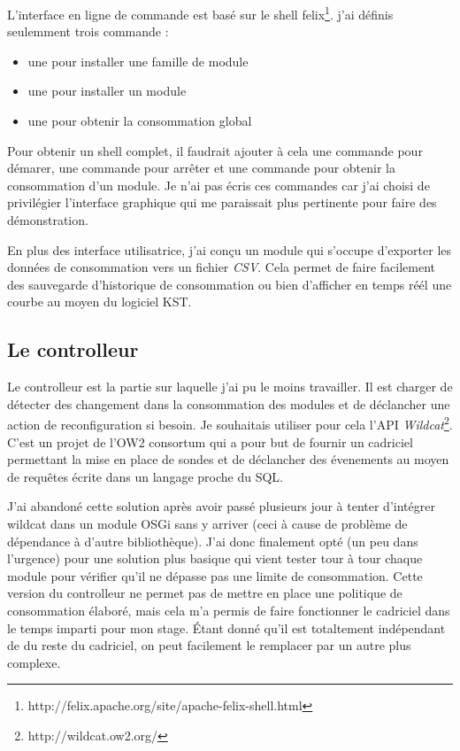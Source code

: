 \documentclass[a4paper, 11pt]{report}
\begin{document}
L'interface en ligne de commande est basé sur le shell felix\footnote{http://felix.apache.org/site/apache-felix-shell.html}. j'ai définis seulemment trois commande :
\begin{itemize}
  \item une pour installer une famille de module
  \item une pour installer un module
  \item une pour obtenir la consommation global
\end{itemize}
Pour obtenir un shell complet, il faudrait ajouter à cela une commande pour démarer, une commande pour arrêter et une commande pour obtenir la consommation d'un module. Je n'ai pas écris ces commandes car j'ai choisi de privilégier l'interface graphique qui me paraissait plus pertinente pour faire des démonstration.

En plus des interface utilisatrice, j'ai conçu un module qui s'occupe d'exporter les données de consommation vers un fichier \textit{CSV}. Cela permet de faire facilement des sauvegarde d'historique de consommation ou bien d'afficher en temps réél une courbe au moyen du logiciel KST.
 
		\subsection{Le controlleur}
Le controlleur est la partie sur laquelle j'ai pu le moins travailler. Il est charger de détecter des changement dans la consommation des modules et de déclancher une action de reconfiguration si besoin. Je souhaitais utiliser pour cela l'API \textit{Wildcat}\footnote{http://wildcat.ow2.org/}. C'est un projet de l'OW2 consortum qui a pour but de fournir un cadriciel permettant la mise en place de sondes et de déclancher des évenements au moyen de requêtes écrite dans un langage proche du SQL.

J'ai abandoné cette solution après avoir passé plusieurs jour à tenter d'intégrer wildcat dans un module OSGi sans y arriver (ceci  à cause de problème de dépendance à d'autre bibliothèque). J'ai donc finalement opté (un peu dans l'urgence) pour une solution plus basique qui vient tester tour à tour chaque module pour vérifier qu'il ne dépasse pas une limite de consommation. Cette version du controlleur ne permet pas de mettre en place une politique de consommation élaboré, mais cela m'a permis de faire fonctionner le cadriciel dans le temps imparti pour mon stage. Étant donné qu'il est totaltement indépendant de du reste du cadriciel, on peut facilement le remplacer par un autre plus complexe.
   
\end{document}
